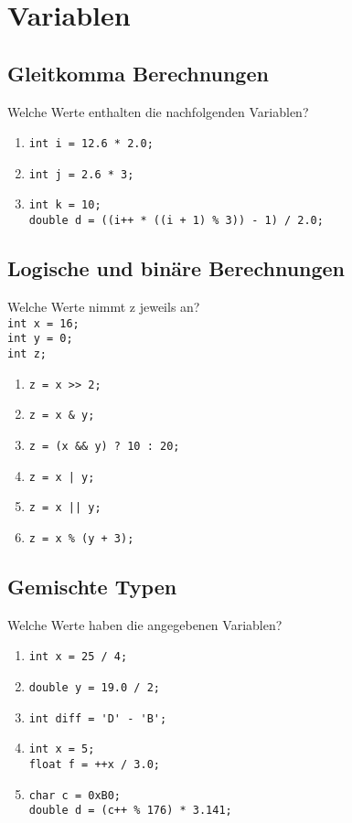 \documentclass[]{scrartcl}
\begin{document}
\section{Variablen}

\subsection{Gleitkomma Berechnungen}
Welche Werte enthalten die nachfolgenden Variablen?

\begin{enumerate}[{1)}]
	\item \lstinline|int i = 12.6 * 2.0;|
	\item \lstinline|int j = 2.6 * 3;|
	\item \lstinline|int k = 10;|\\
	\lstinline|double d = ((i++ * ((i + 1) % 3)) - 1) / 2.0;|
\end{enumerate}

\subsection{Logische und binäre Berechnungen}
Welche Werte nimmt z jeweils an?\\
\lstinline|int x = 16;|\\
\lstinline|int y = 0;|\\
\lstinline|int z;|

\begin{enumerate}[{1)}]
	\item \lstinline|z = x >> 2;|
	\item \lstinline|z = x & y;|
	\item \lstinline|z = (x && y) ? 10 : 20;|
	\item \lstinline{z = x | y;}
	\item \lstinline{z = x || y;}
	\item \lstinline|z = x % (y + 3);|
\end{enumerate}

\subsection{Gemischte Typen}
Welche Werte haben die angegebenen Variablen?\\

\begin{enumerate}[{1)}]
	\item \lstinline|int x = 25 / 4;|
	\item \lstinline|double y = 19.0 / 2;|
	\item \lstinline|int diff = 'D' - 'B';|
	\item \lstinline|int x = 5;|\\
	\lstinline|float f = ++x / 3.0;|
	\item \lstinline|char c = 0xB0;|\\
	\lstinline|double d = (c++ % 176) * 3.141;|
\end{enumerate}
\end{document}
